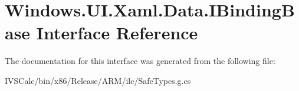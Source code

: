 \hypertarget{interface_windows_1_1_u_i_1_1_xaml_1_1_data_1_1_i_binding_base}{}\section{Windows.\+U\+I.\+Xaml.\+Data.\+I\+Binding\+Base Interface Reference}
\label{interface_windows_1_1_u_i_1_1_xaml_1_1_data_1_1_i_binding_base}


The documentation for this interface was generated from the following file\+:\begin{DoxyCompactItemize}
\item 
I\+V\+S\+Calc/bin/x86/\+Release/\+A\+R\+M/ilc/Safe\+Types.\+g.\+cs\end{DoxyCompactItemize}
